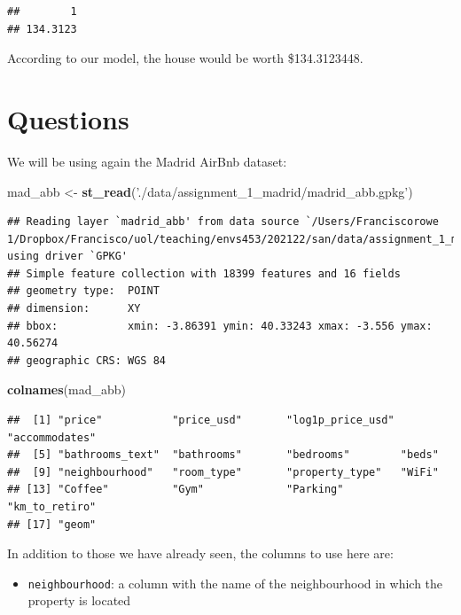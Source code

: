 \documentclass[
]{book}
\newenvironment{Shaded}{\begin{snugshade}}{\end{snugshade}}
\newcommand{\KeywordTok}[1]{\textcolor[rgb]{0.13,0.29,0.53}{\textbf{#1}}}
\newcommand{\NormalTok}[1]{#1}
\newcommand{\StringTok}[1]{\textcolor[rgb]{0.31,0.60,0.02}{#1}}
\providecommand{\tightlist}{%
  \setlength{\itemsep}{0pt}\setlength{\parskip}{0pt}}
\begin{document}
\begin{verbatim}
##        1 
## 134.3123
\end{verbatim}

According to our model, the house would be worth \$134.3123448.

\hypertarget{questions-2}{%
\section{Questions}\label{questions-2}}

We will be using again the Madrid AirBnb dataset:

\begin{Shaded}
\begin{Highlighting}[]
\NormalTok{mad_abb <-}\StringTok{ }\KeywordTok{st_read}\NormalTok{(}\StringTok{'./data/assignment_1_madrid/madrid_abb.gpkg'}\NormalTok{)}
\end{Highlighting}
\end{Shaded}

\begin{verbatim}
## Reading layer `madrid_abb' from data source `/Users/Franciscorowe 1/Dropbox/Francisco/uol/teaching/envs453/202122/san/data/assignment_1_madrid/madrid_abb.gpkg' using driver `GPKG'
## Simple feature collection with 18399 features and 16 fields
## geometry type:  POINT
## dimension:      XY
## bbox:           xmin: -3.86391 ymin: 40.33243 xmax: -3.556 ymax: 40.56274
## geographic CRS: WGS 84
\end{verbatim}

\begin{Shaded}
\begin{Highlighting}[]
\KeywordTok{colnames}\NormalTok{(mad_abb)}
\end{Highlighting}
\end{Shaded}

\begin{verbatim}
##  [1] "price"           "price_usd"       "log1p_price_usd" "accommodates"   
##  [5] "bathrooms_text"  "bathrooms"       "bedrooms"        "beds"           
##  [9] "neighbourhood"   "room_type"       "property_type"   "WiFi"           
## [13] "Coffee"          "Gym"             "Parking"         "km_to_retiro"   
## [17] "geom"
\end{verbatim}

In addition to those we have already seen, the columns to use here are:

\begin{itemize}
\tightlist
\item
  \texttt{neighbourhood}: a column with the name of the neighbourhood in which the property is located
\end{itemize}
\end{document}
